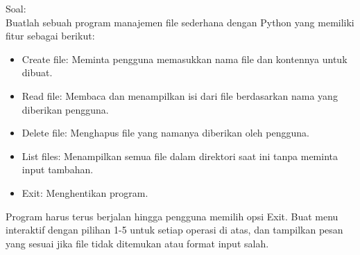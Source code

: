 \documentclass[12pt]{article}
\begin{document}
Soal:\\
Buatlah sebuah program manajemen file sederhana dengan Python yang memiliki fitur sebagai berikut:
\begin{itemize}
    \item Create file: Meminta pengguna memasukkan nama file dan kontennya untuk dibuat.
    \item Read file: Membaca dan menampilkan isi dari file berdasarkan nama yang diberikan pengguna.
    \item Delete file: Menghapus file yang namanya diberikan oleh pengguna.
    \item List files: Menampilkan semua file dalam direktori saat ini tanpa meminta input tambahan.
    \item Exit: Menghentikan program.
\end{itemize}
Program harus terus berjalan hingga pengguna memilih opsi Exit. Buat menu interaktif dengan pilihan 1-5 untuk setiap operasi di atas, dan tampilkan pesan yang sesuai jika file tidak ditemukan atau format input salah.
\end{document}
